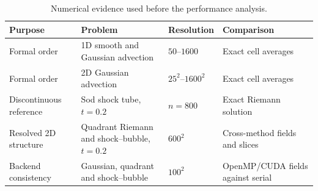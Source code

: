 \begin{table}[H]
\centering
\small
\renewcommand{\arraystretch}{1.25}
\begin{tabular}{@{}p{}p{}p{}p{}@{}}
\toprule
Purpose & Problem & Resolution & Comparison \\
\midrule
Formal order & 1D smooth and Gaussian advection & $50$--$1600$ & Exact cell averages \\
\addlinespace[0.30em]
Formal order & 2D Gaussian advection & $25^2$--$1600^2$ & Exact cell averages \\
\addlinespace[0.30em]
Discontinuous reference & Sod shock tube, $t=0.2$ & $n=800$ & Exact Riemann solution \\
\addlinespace[0.30em]
Resolved 2D structure & Quadrant Riemann and shock--bubble, $t=0.2$ & $600^2$ & Cross-method fields and slices \\
\addlinespace[0.30em]
Backend consistency & Gaussian, quadrant and shock--bubble & $100^2$ & OpenMP/CUDA fields against serial \\
\bottomrule
\end{tabular}
\caption{Numerical evidence used before the performance analysis.}
\label{tab:evidence-matrix}
\end{table}
